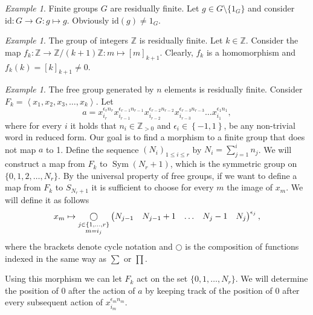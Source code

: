 \documentclass[titlepage, a4paper]{article}
\newcommand{\Z}{\mathbb{Z}}
\newcommand{\id}{\mathrm{id}}
\DeclareMathOperator{\sym}{Sym}
\def\ext{\qopname\relax m{\bigcirc}}
\theoremstyle{theoremdd}
\theoremstyle{definition}
\theoremstyle{remark}
\newtheorem{example}[theorem]{Example}
\begin{document}
\begin{example}
	Finite groups $G$ are residually finite. Let $g \in G \setminus \{1_G\}$ and consider $\id: G \to G: g \mapsto g$. Obviously $\id(g) \neq 1_G$.
\end{example}


\begin{example}
	The group of integers $\mathbb Z$ is residually finite. Let $k \in \mathbb Z$. Consider the map $f_k: \mathbb Z \to \mathbb Z/(k+1)\mathbb Z: m \mapsto [m]_{k+1}$. Clearly, $f_k$ is a homomorphism and $f_k(k) = [k]_{k+1} \neq 0$.
\end{example}

\begin{example}\label{ex:free_group_residually_finite}
	The free group generated by $n$ elements is residually finite. 
	Consider $F_k = \left<x_1, x_2, x_3, \ldots, x_k \right>$.
Let \[
a = x_{i_r}^{\epsilon_r n_r}x_{i_{r-1}}^{\epsilon_{r-1}n_{r-1}}x_{i_{r-2}}^{\epsilon_{r-2}n_{r-2}}x_{i_{r-3}}^{\epsilon_{r-3}n_{r-3}} \ldots x_{i_1}^{\epsilon_1n_1}
,\]
where for every $i$ it holds that $n_i \in \Z_{>0}$ and $\epsilon_i \in \left\{ -1,1 \right\} $, be any non-trivial word in reduced form. 
Our goal is to find a morphism to a finite group that does not map $a$ to 1. 
Define the sequence $(N_i)_{1 \leq i \leq r}$ by $N_i = \sum_{j = 1}^{i} n_j$. 
We will construct a map from $F_k$ to $\sym(N_r + 1)$, which is the symmetric group on $\{0,1, 2, \ldots, N_{r}\} $.  
By the universal property of free groups, if we want to define a map from $F_k$ to $S_{N_r +1}$ it is sufficient to choose for every $m$ the image of $x_m$.
We will define it as follows
\[
	x_m \mapsto \ext_{\substack{j \in \{1,\ldots, r\} \\ m = i_j} } \begin{pmatrix} N_{j-1} & N_{j-1} +  1& \ldots & N_{j} -1 & N_{j} \end{pmatrix}^{\epsilon_j}
,\] 
where the brackets denote cycle notation and $\bigcirc$ is the composition of functions indexed in the same way as  $\sum$ or $\prod$.

Using this morphism we can let $F_k$ act on the set $\{0,1,\ldots, N_r\} $. 
We will determine the position of $0$ after the action of $a$ by keeping track of the position of $0$ after every subsequent  action of  $x_{i_m}^{\epsilon_m n_m}$.


\end{example}
\end{document}
